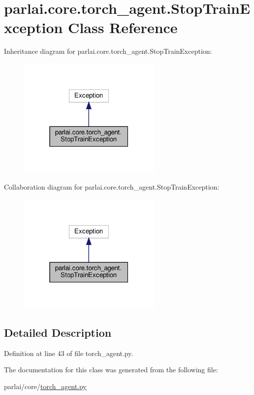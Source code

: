\hypertarget{classparlai_1_1core_1_1torch__agent_1_1StopTrainException}{}\section{parlai.\+core.\+torch\+\_\+agent.\+Stop\+Train\+Exception Class Reference}
\label{classparlai_1_1core_1_1torch__agent_1_1StopTrainException}


Inheritance diagram for parlai.\+core.\+torch\+\_\+agent.\+Stop\+Train\+Exception\+:\nopagebreak
\begin{figure}[H]
\begin{center}
\leavevmode
\includegraphics[width=199pt]{d5/dfa/classparlai_1_1core_1_1torch__agent_1_1StopTrainException__inherit__graph}
\end{center}
\end{figure}


Collaboration diagram for parlai.\+core.\+torch\+\_\+agent.\+Stop\+Train\+Exception\+:\nopagebreak
\begin{figure}[H]
\begin{center}
\leavevmode
\includegraphics[width=199pt]{df/d7c/classparlai_1_1core_1_1torch__agent_1_1StopTrainException__coll__graph}
\end{center}
\end{figure}


\subsection{Detailed Description}


Definition at line 43 of file torch\+\_\+agent.\+py.



The documentation for this class was generated from the following file\+:\begin{DoxyCompactItemize}
\item 
parlai/core/\hyperlink{torch__agent_8py}{torch\+\_\+agent.\+py}\end{DoxyCompactItemize}
